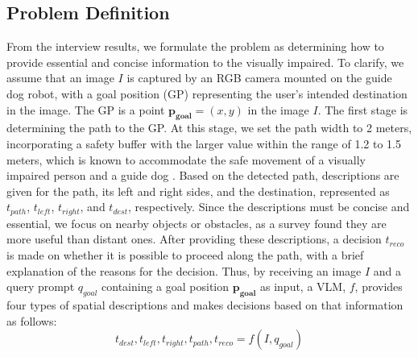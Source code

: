 \subsection{Problem Definition}
From the interview results, we formulate the problem as determining how to provide essential and concise information to the visually impaired.
To clarify, we assume that an image $I$ is captured by an RGB camera mounted on the guide dog robot, with a goal position (GP) representing the user's intended destination in the image.
The GP is a point $\mathbf{p_{goal}} = (x, y)$ in the image $I$. 
The first stage is determining the path to the GP.
At this stage, we set the path width to 2 meters, incorporating a safety buffer with the larger value within the range of 1.2 to 1.5 meters, which is known to accommodate the safe movement of a visually impaired person and a guide dog \cite{MacLennan2015}.
Based on the detected path, descriptions are given for the path, its left and right sides, and the destination, represented as $t_{path}$, $t_{left}$, $t_{right}$, and $t_{dest}$, respectively.
Since the descriptions must be concise and essential, we focus on nearby objects or obstacles, as a survey \cite{Hoogsteen2022} found they are more useful than distant ones.
After providing these descriptions, a decision $t_{reco}$ is made on whether it is possible to proceed along the path, with a brief explanation of the reasons for the decision.
Thus, by receiving an image $I$ and a query prompt $q_{goal}$ containing a goal position $\mathbf{p_{goal}}$ as input, a VLM, $f$, provides four types of spatial descriptions and makes decisions based on that information as follows:
\begin{equation}
t_{dest}, t_{left}, t_{right}, t_{path}, t_{reco} = f(I, q_{goal})
\end{equation}
